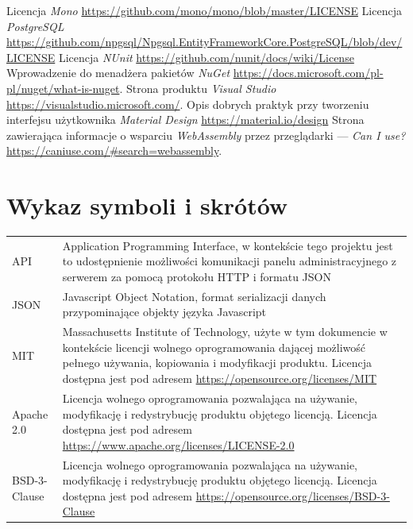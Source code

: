 \documentclass[a4paper,11pt,twoside]{report}
\theoremstyle{definition}
\begin{document}
\begin{thebibliography}{25}
     Licencja \emph{Mono} \url{https://github.com/mono/mono/blob/master/LICENSE}
     Licencja \emph{PostgreSQL} \url{https://github.com/npgsql/Npgsql.EntityFrameworkCore.PostgreSQL/blob/dev/LICENSE}
     Licencja \emph{NUnit} \url{https://github.com/nunit/docs/wiki/License}
     Wprowadzenie do menadżera pakietów \emph{NuGet} \url{https://docs.microsoft.com/pl-pl/nuget/what-is-nuget}.
     Strona produktu \emph{Visual Studio} \url{https://visualstudio.microsoft.com/}.
     Opis dobrych praktyk przy tworzeniu interfejsu użytkownika \emph{Material Design} \url{https://material.io/design}
     Strona zawierająca informacje o wsparciu \textit{WebAssembly} przez przeglądarki --- \emph{Can I use?} \url{https://caniuse.com/#search=webassembly}.
\end{thebibliography}

\thispagestyle{empty}



\chapter*{Wykaz symboli i skrótów}

\begin{tabular}{p{} p{}}
    API 
    & Application Programming Interface, w kontekście tego projektu jest to udostępnienie możliwości komunikacji panelu administracyjnego z serwerem za pomocą protokołu HTTP i formatu JSON \\
    JSON
    & Javascript Object Notation, format serializacji danych przypominające objekty języka Javascript \\
    MIT
    & Massachusetts Institute of Technology, użyte w tym dokumencie w kontekście licencji wolnego oprogramowania dającej możliwość pełnego używania, kopiowania i modyfikacji produktu. Licencja dostępna jest pod adresem \newline
    \url{https://opensource.org/licenses/MIT} \\
    Apache 2.0
    & Licencja wolnego oprogramowania pozwalająca na używanie, modyfikację i redystrybucję produktu objętego licencją. Licencja dostępna jest pod adresem \newline
    \url{https://www.apache.org/licenses/LICENSE-2.0} \\
    BSD-3-Clause
    & Licencja wolnego oprogramowania pozwalająca na używanie, modyfikację i redystrybucję produktu objętego licencją. Licencja dostępna jest pod adresem \newline
    \url{https://opensource.org/licenses/BSD-3-Clause}
\end{tabular}
\\
\thispagestyle{empty}
\end{document}
